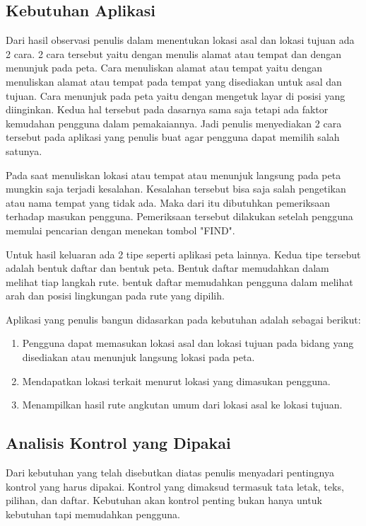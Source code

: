 \subsection{Kebutuhan Aplikasi}
\label{lab:Kebutuhan Aplikasi}
\hspace{0.5cm} Dari hasil observasi penulis dalam menentukan lokasi asal dan lokasi tujuan ada 2 cara. 2 cara tersebut yaitu dengan menulis alamat atau tempat dan dengan menunjuk pada peta. Cara menuliskan alamat atau tempat yaitu dengan menuliskan alamat atau tempat pada tempat yang disediakan untuk asal dan tujuan. Cara menunjuk pada peta yaitu dengan mengetuk layar di posisi yang diinginkan. Kedua hal tersebut pada dasarnya sama saja tetapi ada faktor kemudahan pengguna dalam pemakaiannya. Jadi penulis menyediakan 2 cara tersebut pada aplikasi yang penulis buat agar pengguna dapat memilih salah satunya.

\hspace{0.5cm} Pada saat menuliskan lokasi atau tempat atau menunjuk langsung pada peta mungkin saja terjadi kesalahan. Kesalahan tersebut bisa saja salah pengetikan atau nama tempat yang tidak ada. Maka dari itu dibutuhkan pemeriksaan terhadap masukan pengguna. Pemeriksaan tersebut dilakukan setelah pengguna memulai pencarian dengan menekan tombol "FIND".

\hspace{0.5cm} Untuk hasil keluaran ada 2 tipe seperti aplikasi peta lainnya. Kedua tipe tersebut adalah bentuk daftar dan bentuk peta. Bentuk daftar memudahkan dalam melihat tiap langkah rute. bentuk daftar memudahkan pengguna dalam melihat arah dan posisi lingkungan pada rute yang dipilih.

\hspace{0.5cm} Aplikasi yang penulis bangun didasarkan pada kebutuhan adalah sebagai berikut:
\begin{enumerate}
	\item Pengguna dapat memasukan lokasi asal dan lokasi tujuan pada bidang yang disediakan atau menunjuk langsung lokasi pada peta.
	\item Mendapatkan lokasi terkait menurut lokasi yang dimasukan pengguna.
	\item Menampilkan hasil rute angkutan umum dari lokasi asal ke lokasi tujuan.
\end{enumerate}

\subsection{Analisis Kontrol yang Dipakai}
\label{lab:Analisis Kontrol yang Dipakai}
\hspace{0.5cm} Dari kebutuhan yang telah disebutkan diatas penulis menyadari pentingnya kontrol yang harus dipakai. Kontrol yang dimaksud termasuk tata letak, teks, pilihan, dan daftar. Kebutuhan akan kontrol penting bukan hanya untuk kebutuhan tapi memudahkan pengguna. 

